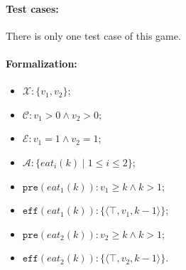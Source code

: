 \documentclass[review]{elsarticle}
\newcommand{\set}[1]{\{ #1 \}}
\newcommand{\tuple}[1]{\langle {#1} \rangle}
\newcommand{\true}{\top}
\newcommand{\statevar}{\mathcal{X}}
\newcommand{\act}{\mathcal{A}}
\newcommand{\constraint}{\mathcal{C}}
\newcommand{\estate}{\mathcal{E}}
\newcommand{\pre}{\mathtt{pre}}
\newcommand{\eff}{\mathtt{eff}}
\begin{document}
\paragraph{Test cases:}
There is only one test case of this game.

\paragraph{Formalization:}
\begin{itemize}
	\item $\statevar: \set{v_1, v_2}$;
	\item $\constraint: v_1 > 0 \wedge  v_2 > 0$;
	\item $\estate: v_1 = 1 \wedge  v_2 = 1$;
	\item $\act:\set{eat_i(k){\mid}1 \le i \le 2}$;
	\item $\pre(eat_1(k)) : v_1 \ge k \wedge k > 1$;
	\item $\eff(eat_1(k)) : \set{\tuple{\true,v_1,k-1}}$;
	\item $\pre(eat_2(k)) : v_2 \ge k \wedge  k > 1$;
	\item $\eff(eat_2(k)) :  \set{\tuple{\true,v_2,k-1}}$.
\end{itemize}









 

\end{document}
